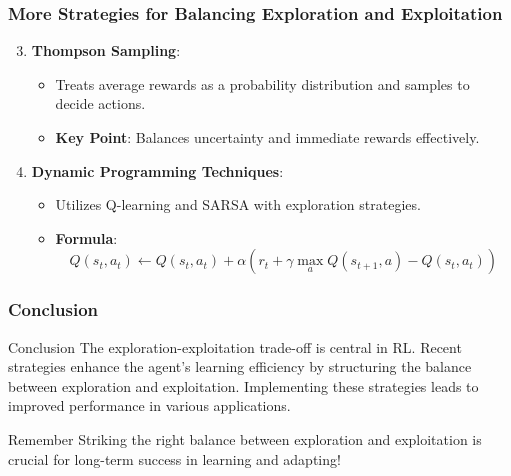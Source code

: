\documentclass[aspectratio=169]{beamer}
\begin{document}
\begin{frame}[fragile]
    \frametitle{More Strategies for Balancing Exploration and Exploitation}
    \begin{enumerate}
        \setcounter{enumi}{2} %
        \item \textbf{Thompson Sampling}:
        \begin{itemize}
            \item Treats average rewards as a probability distribution and samples to decide actions.
            \item \textbf{Key Point}: Balances uncertainty and immediate rewards effectively.
        \end{itemize}
        
        \item \textbf{Dynamic Programming Techniques}:
        \begin{itemize}
            \item Utilizes Q-learning and SARSA with exploration strategies.
            \item \textbf{Formula}:
            \begin{equation}
            Q(s_t, a_t) \leftarrow Q(s_t, a_t) + \alpha \left( r_t + \gamma \max_a Q(s_{t+1}, a) - Q(s_t, a_t) \right)
            \end{equation}
        \end{itemize}
    \end{enumerate}
\end{frame}

\begin{frame}[fragile]
    \frametitle{Conclusion}
    \begin{block}{Conclusion}
        The exploration-exploitation trade-off is central in RL. 
        Recent strategies enhance the agent's learning efficiency by structuring the balance between exploration and exploitation. 
        Implementing these strategies leads to improved performance in various applications.
    \end{block}
    
    \begin{alertblock}{Remember}
        Striking the right balance between exploration and exploitation is crucial for long-term success in learning and adapting!
    \end{alertblock}
\end{frame}
\end{document}
